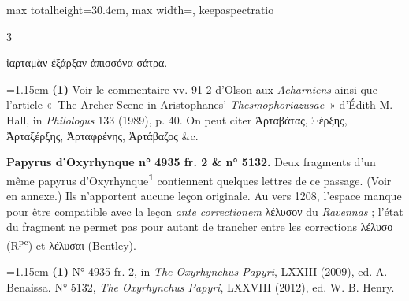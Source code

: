 \documentclass[11pt,twoside]{book}
\newcommand{\currHeadLE}{}
\newcommand{\currHeadRE}{}
\newcommand{\currHeadLO}{}
\newcommand{\currHeadRO}{}
\newcommand{\italique}[1]{\textit{#1}}
\newcommand{\citComm}[1]{\begin{quoting}[vskip=0.4pt,leftmargin=0.7em,rightmargin=0.2em]#1\end{quoting}}
\newcommand{\expo}[1]{\textsuperscript{#1}}
\newcommand{\R}{\textbf{R}}
\newcommand{\Rpc}{R\expo{pc}}
\newcommand{\marqueur}[1]{\textsuperscript{\color{rubricRed}\textbf{#1}}}
\begin{document}
\begin{adjustbox}{max totalheight=30.4cm, max width=\textwidth, keepaspectratio}
\begin{minipage}{\textwidth}
{\begin{multicols}{3}
\citComm{ἰαρταμὰν ἐξάρξαν ἀπισσόνα σάτρα.}
\par\vspace{1.5pt}
\par\vspace{1.2pt}\par\nopagebreak\vspace{1pt}\noindent\hangindent=1.15em {\color{sepiaNote}\textbf{(1)}} Voir le commentaire vv. 91-2 d'Olson aux \italique{Acharniens} ainsi que l'article «~The Archer Scene in Aristophanes' \italique{Thesmophoriazusae}~» d'Édith M. Hall, in \italique{Philologus} 133 (1989), p. 40. On peut citer Ἀρταβάτας, Ξέρξης, Ἀρταξέρξης, Ἀρταφρένης, Ἀρτάβαζος \&c.
\par\vspace{1.5pt}
 \textbf{Papyrus d'Oxyrhynque n° 4935 fr. 2 \& n° 5132.} Deux fragments d'un même papyrus d'Oxyrhynque\marqueur{1} contiennent quelques lettres de ce passage. (Voir en annexe.) Ils n'apportent aucune leçon originale. Au vers 1208, l'espace manque pour être compatible avec la leçon \italique{ante correctionem} λέλυσον du \italique{Ravennas} ; l'état du fragment ne permet pas pour autant de trancher entre les corrections λέλυσο (\Rpc) et λέλυσαι (Bentley).
\par\vspace{1.5pt}
\par\vspace{1.2pt}\par\nopagebreak\vspace{1pt}\noindent\hangindent=1.15em {\color{sepiaNote}\textbf{(1)}} N° 4935 fr. 2, in \italique{The Oxyrhynchus Papyri}, LXXIII (2009), ed. A. Benaissa. N° 5132, \italique{The Oxyrhynchus Papyri}, LXXVIII (2012), ed. W. B. Henry.
\par\end{multicols}}
\end{minipage}\end{adjustbox}
\clearpage\ifodd\value{page}\hbox{}\newpage\fi
\renewcommand{\currHeadLE}{ΑΡΙΣΤΟΦΑΝΟΥΣ ΘΕΣΜΟΦΟΡΙΑΖΟΥΣΑΙ · CODEX RAVENNAS 429 (\R)}
\renewcommand{\currHeadRE}{Folio f. 177r (Classense 179r) · vv. 1211–1231}
\renewcommand{\currHeadLO}{FAC-SIMILÉ DU CODEX RAVENNAS 429 (\R) · f. 177r (Classense 179r)}
\renewcommand{\currHeadRO}{vv. 1211–1231 · Planche recadrée sur la zone écrite et harmonisée}
\end{document}
